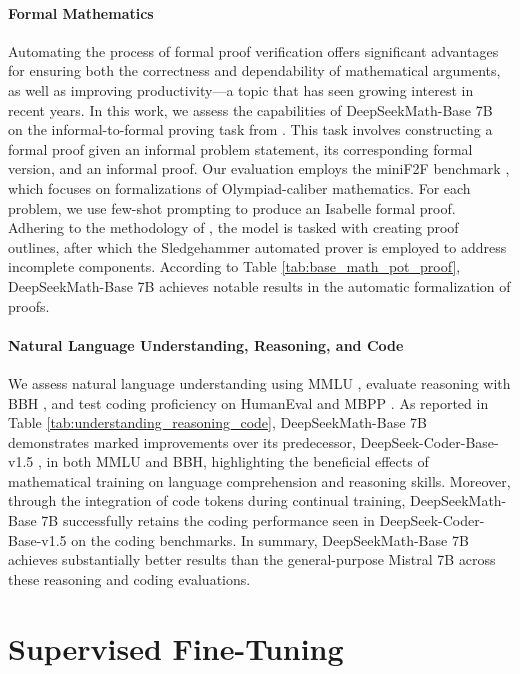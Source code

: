 \begin{itemize}[topsep=0pt]
\paragraph{Formal Mathematics}

Automating the process of formal proof verification offers significant advantages for ensuring both the correctness and dependability of mathematical arguments, as well as improving productivity—a topic that has seen growing interest in recent years. In this work, we assess the capabilities of DeepSeekMath-Base 7B on the informal-to-formal proving task from \citep{dsp_proof}. This task involves constructing a formal proof given an informal problem statement, its corresponding formal version, and an informal proof. Our evaluation employs the miniF2F benchmark \citep{minif2f}, which focuses on formalizations of Olympiad-caliber mathematics. For each problem, we use few-shot prompting to produce an Isabelle formal proof. Adhering to the methodology of \cite{dsp_proof}, the model is tasked with creating proof outlines, after which the Sledgehammer automated prover \citep{sledgehammer} is employed to address incomplete components. According to Table \ref{tab:base_math_pot_proof}, DeepSeekMath-Base 7B achieves notable results in the automatic formalization of proofs.

\paragraph{Natural Language Understanding, Reasoning, and Code}

We assess natural language understanding using MMLU \citep{mmlu}, evaluate reasoning with BBH \citep{bbh}, and test coding proficiency on HumanEval \citep{codex} and MBPP \citep{mbpp}. As reported in Table \ref{tab:understanding_reasoning_code}, DeepSeekMath-Base 7B demonstrates marked improvements over its predecessor, DeepSeek-Coder-Base-v1.5 \citep{deepseek-coder}, in both MMLU and BBH, highlighting the beneficial effects of mathematical training on language comprehension and reasoning skills. Moreover, through the integration of code tokens during continual training, DeepSeekMath-Base 7B successfully retains the coding performance seen in DeepSeek-Coder-Base-v1.5 on the coding benchmarks. In summary, DeepSeekMath-Base 7B achieves substantially better results than the general-purpose Mistral 7B \citep{mistral} across these reasoning and coding evaluations.

\section{Supervised Fine-Tuning}


\end{itemize}
